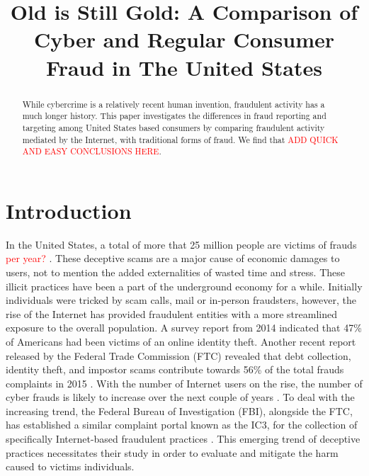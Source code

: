 \documentclass[conference]{IEEEtran}
\newcommand{\ck}[1]{\textcolor{red}{#1}}
\begin{document}
\title{Old is Still Gold: A Comparison of Cyber and Regular Consumer Fraud in The United States}



\maketitle

\begin{abstract}

While cybercrime is a relatively recent human invention, fraudulent activity has a much longer history. This paper investigates the differences in fraud reporting and targeting among United States based consumers by comparing fraudulent activity mediated by the Internet, with traditional forms of fraud. We find that \ck{ADD QUICK AND EASY CONCLUSIONS HERE}.

\end{abstract}


\section{Introduction}

In the United States, a total of more that 25 million people are victims of frauds \ck{per year?} \cite{anderson2013consumer}. These deceptive scams are a major cause of economic damages to users, not to mention the added externalities of wasted time and stress. These illicit practices have been a part of the underground economy for a while. Initially individuals were tricked by scam calls, mail or in-person fraudsters, however, the rise of the Internet has provided fraudulent entities with a more streamlined exposure to the overall population. A  survey report from 2014 indicated that 47\% of Americans had been victims of an online identity theft. Another recent report released by the  Federal Trade Commission (FTC) revealed that debt collection, identity theft, and impostor scams contribute towards 56\% of the total frauds complaints in 2015 \cite{ftcpress2016} . With the number of Internet users on the rise, the number of cyber frauds is likely to increase over the next couple of years \cite{perharassment}. To deal with the increasing trend, the Federal Bureau of Investigation (FBI), alongside the FTC, has established a similar complaint portal known as the IC3, for the collection of specifically Internet-based fraudulent practices \cite{fbiic3}. This emerging trend of deceptive practices necessitates their study in order to evaluate and mitigate the harm caused to victims individuals.
\end{document}
